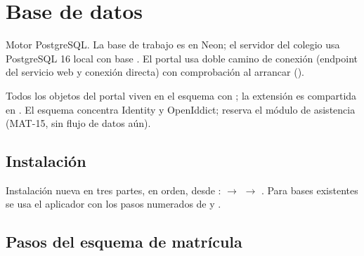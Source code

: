 \section{Base de datos}

Motor PostgreSQL. La base de trabajo es  en Neon; el servidor
del colegio usa PostgreSQL 16 local con base . El
portal usa doble camino de conexión (endpoint del servicio web y conexión
directa) con comprobación  al arrancar
().

Todos los objetos del portal viven en el esquema 
con ; la extensión
 es compartida en . El esquema
 concentra Identity y OpenIddict; 
reserva el módulo de asistencia (MAT-15, sin flujo de datos aún).

\subsection{Instalación}

Instalación nueva en tres partes, en orden, desde
:
 $\rightarrow$ 
$\rightarrow$ . Para bases existentes se usa
el aplicador  con los pasos numerados de
 y .

\subsection{Pasos del esquema de matrícula}

